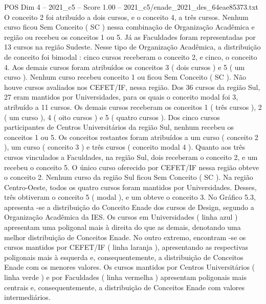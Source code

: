 \begin{textsample}{POS Dim 4 – 2021\_c5 – Score 1.00 – 2021\_c5/enade\_2021\_des\_64eae85373.txt}
O conceito 2 foi atribuído a dois cursos, e o conceito 4, a três cursos.
Nenhum curso ficou Sem Conceito ( SC ) nessa combinação de Organização Acadêmica e região ou recebeu os conceitos 1 ou 5.
Já as Faculdades foram representadas por 13 cursos na região Sudeste.
Nesse tipo de Organização Acadêmica, a distribuição de conceito foi bimodal : cinco cursos receberam o conceito 2, e cinco, o conceito 4.
Aos demais cursos foram atribuídos os conceitos 3 ( dois cursos ) e 5 ( um curso ).
Nenhum curso recebeu conceito 1 ou ficou Sem Conceito ( SC ).
Não houve cursos avaliados nos CEFET/IF, nessa região.
Dos 36 cursos da região Sul, 27 eram mantidos por Universidades, para os quais o conceito modal foi 3, atribuído a 11 cursos.
Os demais cursos receberam os conceitos 1 ( três cursos ), 2 ( um curso ), 4 ( oito cursos ) e 5 ( quatro cursos ).
Dos cinco cursos participantes de Centros Universitários da região Sul, nenhum recebeu os conceitos 1 ou 5.
Os conceitos restantes foram atribuídos a um curso ( conceito 2 ), um curso ( conceito 3 ) e três cursos ( conceito modal 4 ).
Quanto aos três cursos vinculados a Faculdades, na região Sul, dois receberam o conceito 2, e um recebeu o conceito 5.
O único curso oferecido por CEFET/IF nessa região obteve o conceito 2.
Nenhum curso da região Sul ficou Sem Conceito ( SC ).
Na região Centro-Oeste, todos os quatro cursos foram mantidos por Universidades.
Desses, três obtiveram o conceito 5 ( modal ), e um obteve o conceito 3.
No Gráfico 5.3, apresenta -se a distribuição do Conceito Enade dos cursos de Design, segundo a Organização Acadêmica da IES.
Os cursos em Universidades ( linha azul ) apresentam uma poligonal mais à direita do que as demais, denotando uma melhor distribuição de Conceitos Enade.
No outro extremo, encontram -se os cursos mantidos por CEFET/IF ( linha laranja ), apresentando as respectivas poligonais mais à esquerda e, consequentemente, a distribuição de Conceitos Enade com os menores valores.
Os cursos mantidos por Centros Universitários ( linha verde ) e por Faculdades ( linha vermelha ) apresentam poligonais mais centrais e, consequentemente, a distribuição de Conceitos Enade com valores intermediários.

\end{textsample}
